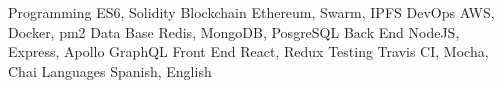 


\begin{cvskills}

\cvskill
{Programming} %
{ES6, Solidity} %
\cvskill
{Blockchain} %
{Ethereum, Swarm, IPFS} %
\cvskill
{DevOps} %
{AWS, Docker, pm2} %
\cvskill
{Data Base} %
{Redis, MongoDB, PosgreSQL} %
\cvskill
{Back End} %
{NodeJS, Express, Apollo GraphQL} %
\cvskill
{Front End} %
{React, Redux} %
\cvskill
{Testing} %
{Travis CI, Mocha, Chai} %
\cvskill
{Languages} %
{Spanish, English} %
\end{cvskills}
